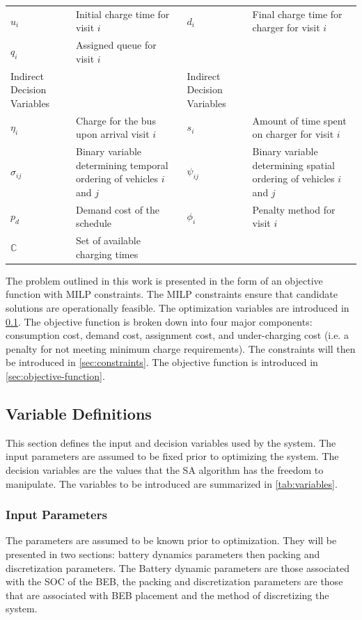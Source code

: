\documentclass[ee,thesis]{usuthesis}
\newcommand{\C}{\mathbb{C}}                 %
\begin{document}
\begin{table}[htbp]
\begin{tabularx}{\textwidth}{L{0.3} L{1.2} L{0.3} L{1.2}}
\(u_i\) & Initial charge time for visit \(i\) & \(d_i\) & Final charge time for charger for visit \(i\)\\[0pt]
\(q_i\) & Assigned queue for visit \(i\) &  & \\[0pt]
Indirect Decision Variables &  & Indirect Decision Variables & \\[0pt]
\(\eta_i\) & Charge for the bus upon arrival visit \(i\) & \(s_i\) & Amount of time spent on charger for visit \(i\)\\[0pt]
\(\sigma_{ij}\) & Binary variable determining temporal ordering of vehicles \(i\) and \(j\) & \(\psi_{ij}\) & Binary variable determining spatial ordering of vehicles \(i\) and \(j\)\\[0pt]
\(p_{d}\) & Demand cost of the schedule & \(\phi_i\) & Penalty method for visit \(i\)\\[0pt]
\(\C\) & Set of available charging times &  & \\[0pt]
\hline
\end{tabularx}
\end{table}
The problem outlined in this work is presented in the form of an objective function with MILP constraints. The MILP
constraints ensure that candidate solutions are operationally feasible. The optimization variables are introduced in
\ref{sec:parameter-definitions}. The objective function is broken down into four major components: consumption cost, demand
cost, assignment cost, and under-charging cost (i.e. a penalty for not meeting minimum charge requirements). The
constraints will then be introduced in \ref{sec:constraints}. The objective function is introduced in
\ref{sec:objective-function}.

\subsection{Variable Definitions}
\label{sec:parameter-definitions}
This section defines the input and decision variables used by the system. The input parameters are assumed to be fixed
prior to optimizing the system. The decision variables are the values that the SA algorithm has the freedom to
manipulate. The variables to be introduced are summarized in \ref{tab:variables}.

\subsubsection{Input Parameters}
\label{sec:input-variables}
The parameters are assumed to be known prior to optimization. They will be presented in two sections: battery dynamics
parameters then packing and discretization parameters. The Battery dynamic parameters are those associated with the SOC
of the BEB, the packing and discretization parameters are those that are associated with BEB placement and the method of
discretizing the system.
\end{document}
